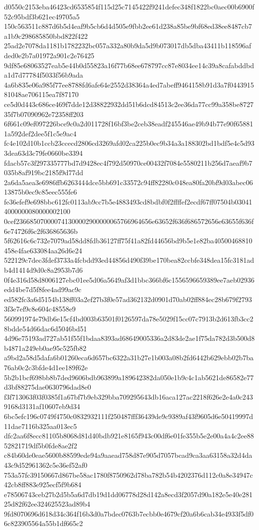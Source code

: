 {d0550c2153eba46423cd6535854f115d25c7145422f9241defec348f1822bc0aec00b6900f52c95bdf3b621ec49705a5
150c563511c887d6b5d4eaf9b5cb6d4d505e9fbb2ee61d238a85be9bf68ed38ee8487cb7a1b9c298685850bbd822f422
25ad2e7078da1181b1782232bc057a332a80b9da5d9b073017db5dba43411b118596afded0e2b7a01972a901c2e76425
9df85e68063527eab5e44b0d55823a16f77b68ee678797cc87e8034ee14c39a8cafabddbda1d7d77784f5033f56b9ada
4a6b835e06a985f77ee8788fd6afe64e2552d38364a4ed7abeff9464158b91d3a7f044391581048ae706115ea7f87170
ce5d0d443c686ce469f7dde12d38822932dd51b6dcd84513c2ee36da77cc99a358be872735f7b07090962e72358ff203
6f661c09ef097226bce9c0a2d011728f16bf3be2ceb38eadf245546ae49b94b77e90f658811a592def2dee5f1c5e9ac4
fc4e102d10b1ccb23ccecd2806cd3269afd02ca225b0ec9b34a3a188302bd1bdf5e4c5d933dea63d3c79fe0660be3394
fdacb57c3f297335777bd7d9428ec4f792d50970ce00432f7084e5580211b256d7aeaf9b7035b8af919bc2185f9d77dd
2a6da5aea3e6986ffb6263444dce5bb691c33572c94ff82280c048ea80fa20bf9d03abec0613875b0ec9c85eec555fe6
fe36efef9e698bbc612fc0113ab9cc7b5e4883493cd8bdbf0f2ffffef2ecdf67ff07504b030414000000080000002100
0cef236685070000741300002900000065766964656e63652f636f686572656e63655f636f6e74726f6c2f636865636b
5f62616c6c732e7079ad58dd8fdb36127ff75f41a82fd44656bd9b5e1e82ba40500468810458e4fae633084aa26d6e24
522129c7dec3fdef3733a4fcbdd93ed44856d490f39be170bea82ccbfe348dea15fc3181adb4d1414d9d0c8a2953b7d6
0f4e316d58d8006127ebc01ee5d06a5649af3d1bbc366bf6c1556596659389ee7aeb02936edd4be7d5f8fee4ad99ac9c
ed582fc3a6d5154b138ff03a2ef27b3f0e57ad362132d0901d70ab02ff884ec28b679f27933f3e7ef9c8e604c48558e9
560991974e79db6e15cf4bd003b63501f0126597da78e5029f15cc07c7913b2d613fb3cc28bdde54d66dac6d5046bd51
4d96e75193ad727ab51f55f1bdaa8393ad68649005336a2d83de2ae1f75da782d3b500d8b4871a249eb0ae95c525fb82
a9bd2a58d5dafa6b01260eca6d657bc6322a31b27e1b003a08b2fd6442b629ebb02b7ba76ab0c2c3bfde4d1ee189f62e
5b2b1bcf698bb8b7ded9606bdb963899a189642382da050e1b9c4c1ab5621de86582e77d3bf88275dae0630796dad8e0
f3f713063f03f0385f1a67bf7b9eb329bba709295643db16aca127ac2218f626e2e4a0c2439168d3131af10607eb9d34
6bc5efc196c0749f4750c0832932111f250487fff36439de9c9389af43f9605d6e50419997d11dae7116b325aa013ec5
dfc2aa6f8ecc81105b8068d81d40bdb921e8165f943c00df6e01fe355b5e2e00a4a4c2ee8852821719df5b0fde8ae2f2
c84b60de0eae5600b88599ede94a9aaead758d87e905d7057bcad9ca3aa63158a32d4da43c9d52961362c5e36ef52af0
753a57fc39150667d867be58ac1780f8750962d78ba782b54b4202376d112c0a8e34947c42cb8ff883e925ecf5f9b684
e78506743ceb27b2d5b5a6d7db19d1dd06778d28d142a8ecd3f2057d90a182e5e40e28125d82f62ee324625523ad89b4
9fd8070696d618d34c364f16b3d0a7bdec0763b7ecbb0e4679cf20a6b6cab34e4933f5df06c823905564a55b1df665c2
}
